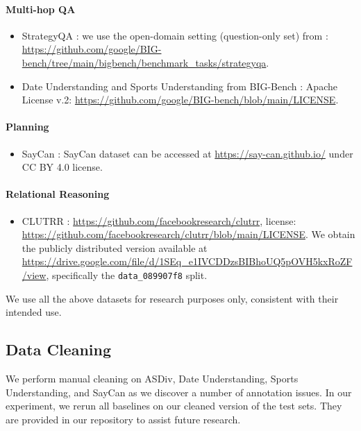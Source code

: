 \documentclass[11pt]{article}
\begin{document}
\paragraph{Multi-hop QA}
\begin{itemize}
    \item StrategyQA \citep{geva_did_2021}: we use the open-domain setting (question-only set) from \cite{big-bench_collaboration_beyond_2021}: \url{https://github.com/google/BIG-bench/tree/main/bigbench/benchmark_tasks/strategyqa}.
    \item Date Understanding and Sports Understanding from BIG-Bench \citep{big-bench_collaboration_beyond_2021}: Apache License v.2: \url{https://github.com/google/BIG-bench/blob/main/LICENSE}.
\end{itemize}

\paragraph{Planning}
\begin{itemize}
    \item SayCan \citep{ahn_as_2022}: SayCan dataset can be accessed at \url{https://say-can.github.io/} under CC BY 4.0 license.
\end{itemize}

\paragraph{Relational Reasoning}
\begin{itemize}
    \item CLUTRR \citep{sinha_clutrr_2019}: \url{https://github.com/facebookresearch/clutrr}, license: \url{https://github.com/facebookresearch/clutrr/blob/main/LICENSE}. We obtain the publicly distributed version available at \url{https://drive.google.com/file/d/1SEq_e1IVCDDzsBIBhoUQ5pOVH5kxRoZF/view}, specifically the \texttt{data\_089907f8} split.
\end{itemize}

We use all the above datasets for research purposes only, consistent with their intended use.

\subsection{Data Cleaning}
We perform manual cleaning on ASDiv, Date Understanding, Sports Understanding, and SayCan as we discover a number of annotation issues. In our experiment, we rerun all baselines on our cleaned version of the test sets. They are provided in our repository to assist future research. 
\end{document}
